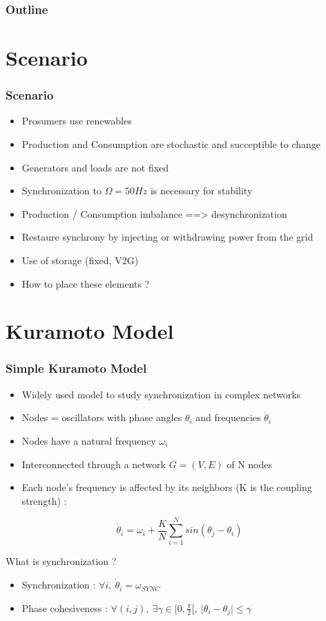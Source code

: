 \documentclass[xcolor=dvipsnames]{beamer}
\begin{document}
\begin{frame}
	\frametitle{Outline}
	\tableofcontents
\end{frame}

\section{Scenario}
\begin{frame}
	\frametitle{Scenario}
	
	\begin{itemize}
		\item Prosumers use renewables
		\item Production and Consumption are stochastic and succeptible to change
		\item Generators and loads are not fixed
		\item Synchronization to $ \Omega=50Hz $ is necessary for stability
		\item Production / Consumption imbalance ==> desynchronization
		\item Restaure synchrony by injecting or withdrawing power from the grid
		\item Use of storage (fixed, V2G)
		\item How to place these elements ?
	\end{itemize}
\end{frame}


\section{Kuramoto Model}
\begin{frame}
	\tableofcontents[currentsection]
\end{frame}

\begin{frame}
	\frametitle{Simple Kuramoto Model}
	
	\begin{itemize}
		\item Widely used model to study synchronization in complex networks
		\item Nodes = oscillators with phase angles $ \theta_i $ and frequencies $ \dot{\theta}_i $
		\item Nodes have a natural frequency $\omega_i $
		\item Interconnected through a network $G=(V,E)$ of N nodes
		\item Each node's frequency is affected by its neighbors (K is the coupling strength) :
	\end{itemize}
	\begin{center}
		\[ \dot{\theta}_i = \omega_i + \frac{K}{N} \sum_{i=1}^{N} sin(\theta_j - \theta_i) \]
	\end{center}
	What is synchronization ?
	\begin{itemize}
		\item Synchronization : $ \forall i,\ \dot{\theta}_i = \omega_{SYNC} $
		\item Phase cohesiveness : $ \forall (i,j),\ \exists \gamma \in [0,\frac{\pi}{2}[,\ \vert \theta_i - \theta_j \vert \leq \gamma $
	\end{itemize}	
\end{frame}
\end{document}
